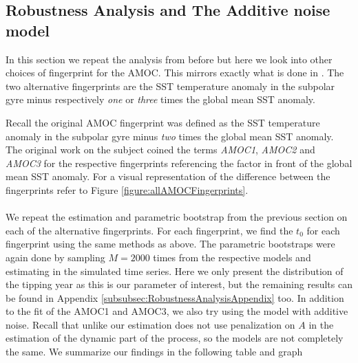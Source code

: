 \subsection{Robustness Analysis and The Additive noise model}
In this section we repeat the analysis from before but here we look into other choices of fingerprint for the AMOC. This mirrors exactly what is done in \cite{Ditlevsen2023}. The two alternative fingerprints are the SST temperature anomaly in the subpolar gyre minus respectively \textit{one} or \textit{three} times the global mean SST anomaly.

Recall the original AMOC fingerprint was defined as the SST temperature anomaly in the subpolar gyre minus \textit{two} times the global mean SST anomaly. The original work on the subject coined the terms \textit{AMOC1}, \textit{AMOC2} and \textit{AMOC3} for the respective fingerprints referencing the factor in front of the global mean SST anomaly. For a visual representation of the difference between the fingerprints refer to Figure \ref{figure:allAMOCFingerprints}.\\\\
We repeat the estimation and parametric bootstrap from the previous section on each of the alternative fingerprints. For each fingerprint, we find the $t_0$ for each fingerprint using the same methods as above. The parametric bootstraps were again done by sampling $M = 2000$ times from the respective models and estimating in the simulated time series. Here we only present the distribution of the tipping year as this is our parameter of interest, but the remaining results can be found in Appendix \ref{subsubsec:RobustnessAnalysisAppendix} too. In addition to the fit of the AMOC1 and AMOC3, we also try using the model with additive noise. Recall that unlike \cite{Ditlevsen2023} our estimation does not use penalization on $A$ in the estimation of the dynamic part of the process, so the models are not completely the same. We summarize our findings in the following table and graph
